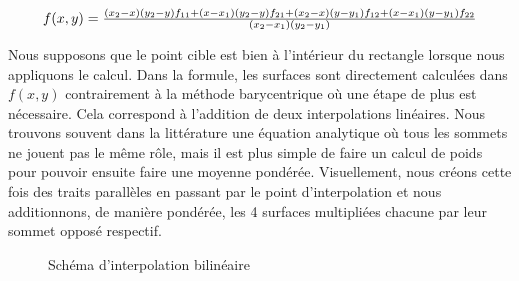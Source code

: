 \vspace{-0.4cm}

\begin{equation}
    \resizebox{0.9\hsize}{!}{$
    f(x, y) = \frac{(x_2 - x)(y_2 - y)f_{11} + (x - x_1)(y_2 - y)f_{21} + (x_2 - x)(y - y_1)f_{12} + (x - x_1)(y - y_1)f_{22}}{(x_2 - x_1)(y_2 - y_1)}
    $}
\end{equation}
                
Nous supposons que le point cible est bien à l'intérieur du rectangle lorsque nous appliquons le calcul.
Dans la formule, les surfaces sont directement calculées dans \(f(x, y)\) contrairement à la méthode barycentrique où une étape de plus est nécessaire.
Cela correspond à l'addition de deux interpolations linéaires. Nous trouvons souvent dans la littérature une équation analytique où tous les sommets ne jouent pas le même rôle, mais il est plus simple de faire un calcul de poids pour pouvoir ensuite faire une moyenne pondérée. 
Visuellement, nous créons cette fois des traits parallèles en passant par le point d'interpolation et nous additionnons, de manière pondérée, les 4 surfaces multipliées chacune par leur sommet opposé respectif.

\begin{figure}[H]
    \centering
    \caption{Schéma d'interpolation bilinéaire}
\end{figure}


